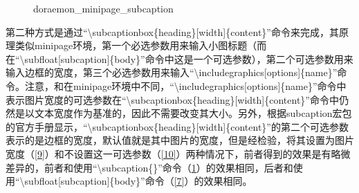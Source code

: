 \documentclass{article}
\begin{document}
\begin{figure}[htbp]
{\begin{minipage}{.25\textwidth}
        \end{minipage}
    }
    \caption{doraemon\_minipage\_subcaption}
    \label{8}
    \end{figure}

    第二种方式是通过``\textbackslash subcaptionbox\{heading\}[width]\{content\}''命令来完成，其原理类似minipage环境，第一个必选参数用来输入小图标题（而在``\textbackslash subfloat[subcaption]\{body\}''命令中这是一个可选参数），第二个可选参数用来输入边框的宽度，第三个必选参数用来输入``\textbackslash includegraphics[options]\{name\}''命令。注意，和在minipage环境中不同，``\textbackslash includegraphics[options]\{name\}''命令中表示图片宽度的可选参数在``\textbackslash subcaptionbox\{heading\}[width]\{content\}''命令中仍然是以文本宽度作为基准的，因此不需要改变其大小。另外，根据subcaption宏包的官方手册显示，``\textbackslash subcaptionbox\{heading\}[width]\{content\}''的第二个可选参数表示的是边框的宽度，默认值就是其中图片的宽度，但是经检验，将其设置为图片宽度（\ref{9}）和不设置这一可选参数（\ref{10}）两种情况下，前者得到的效果是有略微差异的，前者和使用``\textbackslash subcaption\{\}''命令（\ref{8}）的效果相同，后者和使用``\textbackslash subfloat[subcaption]\{body\}''命令（\ref{7}）的效果相同。
\end{document}
